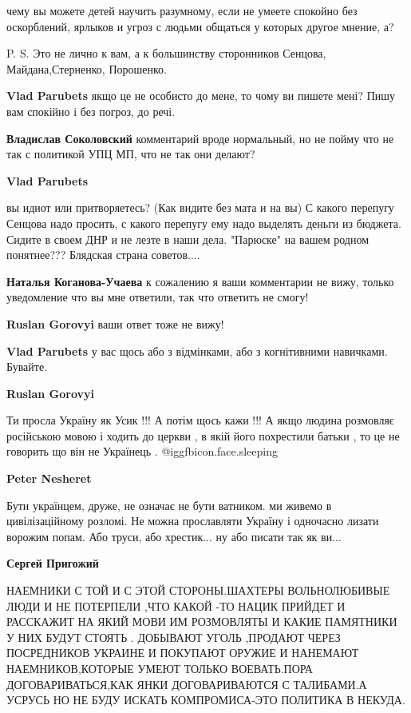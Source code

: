 \begin{itemize}
\begin{itemize}
чему вы можете детей научить разумному, если не умеете спокойно без
оскорблений, ярлыков и угроз с людьми общаться у которых другое мнение, а?

P. S. Это не лично к вам, а к большинству сторонников Сенцова,
Майдана,Стерненко, Порошенко.


\textbf{Vlad Parubets} якщо це не особисто до мене, то чому ви пишете мені? Пишу вам спокійно і без погроз, до речі.

\textbf{Владислав Соколовский} комментарий вроде нормальный, но не пойму что не так с политикой УПЦ МП, что не так они делают?

\textbf{Vlad Parubets} 

вы идиот или притворяетесь? (Как видите без мата и на вы) С какого перепугу
Сенцова надо просить, с какого перепугу ему надо выделять деньги из бюджета.
Сидите в своем ДНР и не лезте в наши дела. "Парюске" на вашем родном
понятнее??? Блядская страна советов....


\textbf{Наталья Коганова-Учаева} к сожалению я ваши комментарии не вижу, только уведомление что вы мне ответили, так что ответить не смогу!

\textbf{Ruslan Gorovyi} ваши ответ тоже не вижу!


\textbf{Vlad Parubets} у вас щось або з відмінками, або з когнітивними навичками. Бувайте.

\textbf{Ruslan Gorovyi} 

Ти просла Україну як Усик !!! А потім щось кажи !!! А якщо людина розмовляє
російською мовою і ходить до церкви , в якій його похрестили батьки , то це не
говорить що він не Українець .  @igg{fbicon.face.sleeping} 


\textbf{Peter Nesheret} 

Бути українцем, друже, не означає не бути ватником. ми живемо в цивілізаційному
розломі. Не можна прославляти Україну і одночасно лизати ворожим попам. Або
труси, або хрестик... ну або писати так як ви...

\textbf{Сергей Пригожий} 

НАЕМНИКИ С ТОЙ И С ЭТОЙ СТОРОНЫ.ШАХТЕРЫ ВОЛЬНОЛЮБИВЫЕ ЛЮДИ И НЕ ПОТЕРПЕЛИ ,ЧТО
КАКОЙ -ТО НАЦИК ПРИЙДЕТ И РАССКАЖИТ НА ЯКИЙ МОВИ ИМ РОЗМОВЛЯТЫ И КАКИЕ
ПАМЯТНИКИ У НИХ БУДУТ СТОЯТЬ . ДОБЫВАЮТ УГОЛЬ ,ПРОДАЮТ ЧЕРЕЗ ПОСРЕДНИКОВ
УКРАИНЕ И ПОКУПАЮТ ОРУЖИЕ И НАНЕМАЮТ НАЕМНИКОВ,КОТОРЫЕ УМЕЮТ ТОЛЬКО
ВОЕВАТЬ.ПОРА ДОГОВАРИВАТЬСЯ,КАК ЯНКИ ДОГОВАРИВАЮТСЯ С ТАЛИБАМИ.А УСРУСЬ НО НЕ
БУДУ ИСКАТЬ КОМПРОМИСА-ЭТО ПОЛИТИКА В НЕКУДА.



\end{itemize}
\end{itemize}
